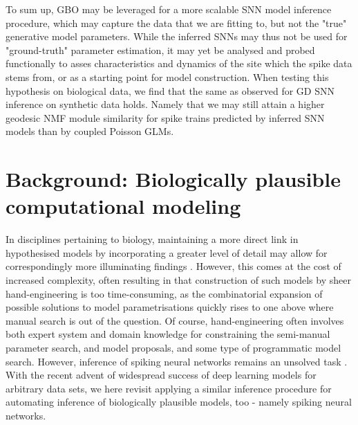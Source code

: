\documentclass[mphil,deptreport,ianc]{infthesis} %
\begin{document}
To sum up,
GBO may be leveraged for a more scalable SNN model inference procedure, which may capture the data that we are fitting to, but not the "true" generative model parameters.
While the inferred SNNs may thus not be used for "ground-truth" parameter estimation, it may yet be analysed and probed functionally to asses characteristics and dynamics of the site which the spike data stems from, or as a starting point for model construction.
When testing this hypothesis on biological data, we find that the same as observed for GD SNN inference on synthetic data holds. Namely that we may still attain a higher geodesic NMF module similarity for spike trains predicted by inferred SNN models than by coupled Poisson GLMs.


\chapter{Background: Biologically plausible computational modeling}\label{chpt:background}

In disciplines pertaining to biology, maintaining a more direct link in hypothesised models by incorporating a greater level of detail may allow for correspondingly more illuminating findings \cite{Izhikevich2004}.
However, this comes at the cost of increased complexity, often resulting in that construction of such models by sheer hand-engineering is too time-consuming, as the combinatorial expansion of possible solutions to model parametrisations quickly rises to one above where manual search is out of the question.
Of course, hand-engineering often involves both expert system and domain knowledge for constraining the semi-manual parameter search, and model proposals, and some type of programmatic model search.
However, inference of spiking neural networks remains an unsolved task \cite{Taherkhani2020, Cramer2019}.
With the recent advent of widespread success of deep learning models for arbitrary data sets, we here revisit applying a similar inference procedure for automating inference of biologically plausible models, too - namely spiking neural networks.
\end{document}
